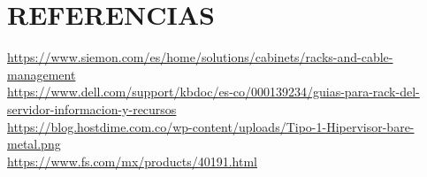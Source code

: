 \section{REFERENCIAS}
\label{sec:REFERENCES}

\url{https://www.siemon.com/es/home/solutions/cabinets/racks-and-cable-management} \\
\url{https://www.dell.com/support/kbdoc/es-co/000139234/guias-para-rack-del-servidor-informacion-y-recursos} \\
\url{https://blog.hostdime.com.co/wp-content/uploads/Tipo-1-Hipervisor-bare-metal.png} \\
\url{https://www.fs.com/mx/products/40191.html}\\



